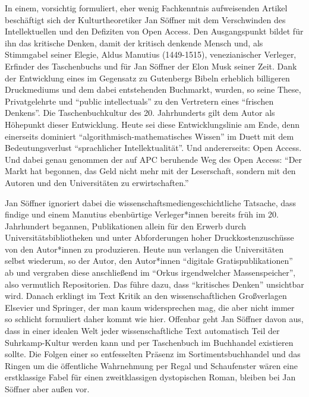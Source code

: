 \documentclass[a4paper,
fontsize=11pt,
oneside,
numbers=noperiodatend,
parskip=half-,
bibliography=totoc,
final
]{scrartcl}
\begin{document}
In einem, vorsichtig formuliert, eher wenig Fachkenntnis aufweisenden
Artikel beschäftigt sich der Kulturtheoretiker Jan Söffner mit dem
Verschwinden des Intellektuellen und den Defiziten von Open Access. Den
Ausgangspunkt bildet für ihn das kritische Denken, damit der kritisch
denkende Mensch und, als Stimmgabel seiner Elegie, Aldus Manutius
(1449-1515), venezianischer Verleger, Erfinder des Taschenbuchs und für
Jan Söffner der Elon Musk seiner Zeit. Dank der Entwicklung eines im
Gegensatz zu Gutenbergs Bibeln erheblich billigeren Druckmediums und dem
dabei entstehenden Buchmarkt, wurden, so seine These, Privatgelehrte und
\enquote{public intellectuals} zu den Vertretern eines \enquote{frischen
Denkens}. Die Taschenbuchkultur des 20. Jahrhunderts gilt dem Autor als
Höhepunkt dieser Entwicklung. Heute sei diese Entwicklungslinie am Ende,
denn einerseits dominiert \enquote{algorithmisch-mathematisches Wissen}
im Duett mit dem Bedeutungsverlust \enquote{sprachlicher
Intellektualität}. Und andererseits: Open Access. Und dabei genau
genommen der auf APC beruhende Weg des Open Access: \enquote{Der Markt
hat begonnen, das Geld nicht mehr mit der Leserschaft, sondern mit den
Autoren und den Universitäten zu erwirtschaften.}

Jan Söffner ignoriert dabei die wissenschaftsmediengeschichtliche
Tatsache, dass findige und einem Manutius ebenbürtige Verleger*innen
bereits früh im 20. Jahrhundert begannen, Publikationen allein für den
Erwerb durch Universitätsbibliotheken und unter Abforderungen hoher
Druckkostenzuschüsse von den Autor*innen zu produzieren. Heute nun
verlangen die Universitäten selbst wiederum, so der Autor, den
Autor*innen \enquote{digitale Gratispublikationen} ab und vergraben
diese anschließend im \enquote{Orkus irgendwelcher Massenspeicher}, also
vermutlich Repositorien. Das führe dazu, dass \enquote{kritisches
Denken} unsichtbar wird. Danach erklingt im Text Kritik an den
wissenschaftlichen Großverlagen Elsevier und Springer, der man kaum
widersprechen mag, die aber nicht immer so schlicht formuliert daher
kommt wie hier. Offenbar geht Jan Söffner davon aus, dass in einer
idealen Welt jeder wissenschaftliche Text automatisch Teil der
Suhrkamp-Kultur werden kann und per Taschenbuch im Buchhandel existieren
sollte. Die Folgen einer so entfesselten Präsenz im Sortimentsbuchhandel
und das Ringen um die öffentliche Wahrnehmung per Regal und Schaufenster
wären eine erstklassige Fabel für einen zweitklassigen dystopischen
Roman, bleiben bei Jan Söffner aber außen vor.
\end{document}

